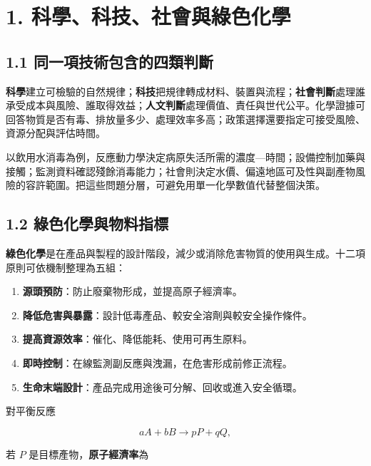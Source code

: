 \documentclass[11pt,a4paper]{article}
\providecommand{\tightlist}{%
  \setlength{\itemsep}{0pt}\setlength{\parskip}{0pt}}
\begin{document}
\section{1. 科學、科技、社會與綠色化學}\label{ux79d1ux5b78ux79d1ux6280ux793eux6703ux8207ux7da0ux8272ux5316ux5b78}

\subsection{1.1 同一項技術包含的四類判斷}\label{ux540cux4e00ux9805ux6280ux8853ux5305ux542bux7684ux56dbux985eux5224ux65b7}

\textbf{科學}建立可檢驗的自然規律；\textbf{科技}把規律轉成材料、裝置與流程；\textbf{社會判斷}處理誰承受成本與風險、誰取得效益；\textbf{人文判斷}處理價值、責任與世代公平。化學證據可回答物質是否有毒、排放量多少、處理效率多高；政策選擇還要指定可接受風險、資源分配與評估時間。

以飲用水消毒為例，反應動力學決定病原失活所需的濃度---時間；設備控制加藥與接觸；監測資料確認殘餘消毒能力；社會則決定水價、偏遠地區可及性與副產物風險的容許範圍。把這些問題分層，可避免用單一化學數值代替整個決策。

\subsection{1.2 綠色化學與物料指標}\label{ux7da0ux8272ux5316ux5b78ux8207ux7269ux6599ux6307ux6a19}

\textbf{綠色化學}是在產品與製程的設計階段，減少或消除危害物質的使用與生成。十二項原則可依機制整理為五組：

\begin{enumerate}
\def\labelenumi{\arabic{enumi}.}
\tightlist
\item
  \textbf{源頭預防}：防止廢棄物形成，並提高原子經濟率。
\item
  \textbf{降低危害與暴露}：設計低毒產品、較安全溶劑與較安全操作條件。
\item
  \textbf{提高資源效率}：催化、降低能耗、使用可再生原料。
\item
  \textbf{即時控制}：在線監測副反應與洩漏，在危害形成前修正流程。
\item
  \textbf{生命末端設計}：產品完成用途後可分解、回收或進入安全循環。
\end{enumerate}

對平衡反應

\[
aA+bB\rightarrow pP+qQ,
\]

若 \(P\) 是目標產物，\textbf{原子經濟率}為
\end{document}
